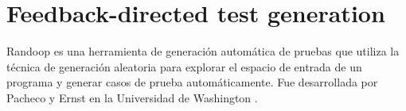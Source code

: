 
\section{Feedback-directed test generation}\label{sec:feedback-directed-test-gen}
Randoop es una herramienta de generación automática de pruebas que utiliza la técnica de generación aleatoria para explorar el espacio de entrada de un programa y generar casos de prueba automáticamente. Fue desarrollada por Pacheco y Ernst en la Universidad de Washington \cite{pacheco2007randoop}.


